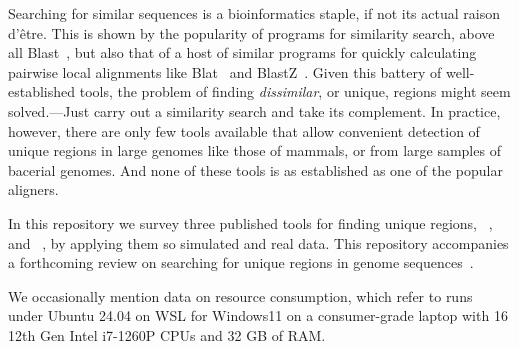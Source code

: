 Searching for similar sequences is a bioinformatics staple, if not its
actual raison d'\^etre. This is shown by the popularity of programs
for similarity search, above all Blast~\cite{alt90:bas,alt97:gap}, but
also that of a host of similar programs for quickly calculating
pairwise local alignments like Blat~\cite{ken02:bla} and
BlastZ~\cite{sch03:hum}. Given this battery of well-established tools,
the problem of finding \emph{dissimilar}, or unique, regions might
seem solved.---Just carry out a similarity search and take its
complement. In practice, however, there are only few tools available
that allow convenient detection of unique regions in large genomes
like those of mammals, or from large samples of bacerial genomes. And
none of these tools is as established as one of the popular aligners.

In this repository we survey three published tools for finding unique
regions, ~\cite{poc20:gen}, ~\cite{pir19:hig}
and ~\cite{hau21:fur,vie24:mar}, by applying them so simulated
and real data. This repository accompanies a forthcoming review on
searching for unique regions in genome sequences~\cite{vie25:fas}.

We occasionally mention data on resource consumption, which refer to
runs under Ubuntu 24.04 on WSL for Windows11 on a consumer-grade
laptop with 16 12th Gen Intel i7-1260P CPUs and 32 GB of RAM.
